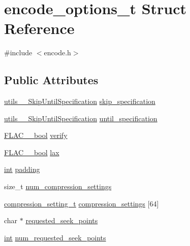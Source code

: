 \hypertarget{structencode__options__t}{}\section{encode\+\_\+options\+\_\+t Struct Reference}
\label{structencode__options__t}


{\ttfamily \#include $<$encode.\+h$>$}

\subsection*{Public Attributes}
\begin{DoxyCompactItemize}
\item 
\hyperlink{structutils_____skip_until_specification}{utils\+\_\+\+\_\+\+Skip\+Until\+Specification} \hyperlink{structencode__options__t_a91f54e0c0206f172d4ff44746cf79c4b}{skip\+\_\+specification}
\item 
\hyperlink{structutils_____skip_until_specification}{utils\+\_\+\+\_\+\+Skip\+Until\+Specification} \hyperlink{structencode__options__t_ab328bbf490ed9ec92155645e31306e76}{until\+\_\+specification}
\item 
\hyperlink{ordinals_8h_a95103469f1cbd78b8cf250194985b34e}{F\+L\+A\+C\+\_\+\+\_\+bool} \hyperlink{structencode__options__t_ac4fc520062f68387a24829a8adf87e4e}{verify}
\item 
\hyperlink{ordinals_8h_a95103469f1cbd78b8cf250194985b34e}{F\+L\+A\+C\+\_\+\+\_\+bool} \hyperlink{structencode__options__t_acbbe22f65285d03d94caf53ef8aa2852}{lax}
\item 
\hyperlink{xmltok_8h_a5a0d4a5641ce434f1d23533f2b2e6653}{int} \hyperlink{structencode__options__t_a7f23939295f899302548b192c67e5cd9}{padding}
\item 
size\+\_\+t \hyperlink{structencode__options__t_a6bf4ff542554aad6beae23000f0a9a3d}{num\+\_\+compression\+\_\+settings}
\item 
\hyperlink{structcompression__setting__t}{compression\+\_\+setting\+\_\+t} \hyperlink{structencode__options__t_a8cf89bc6b442bdc7cfcda48bffa0d9df}{compression\+\_\+settings} \mbox{[}64\mbox{]}
\item 
char $\ast$ \hyperlink{structencode__options__t_aeed9855038c9a03db276967edc518993}{requested\+\_\+seek\+\_\+points}
\item 
\hyperlink{xmltok_8h_a5a0d4a5641ce434f1d23533f2b2e6653}{int} \hyperlink{structencode__options__t_a3ac6bc6544107e15122bb36ac295580c}{num\+\_\+requested\+\_\+seek\+\_\+points}

\end{DoxyCompactItemize}
